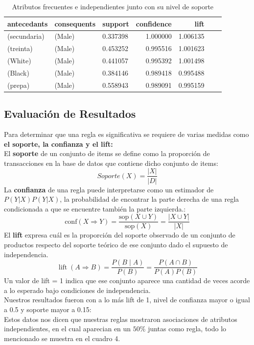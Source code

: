 \documentclass[sigconf]{acmart}
\begin{document}
\begin{table}[ht]
\begin{tabular}{lllrrrr}
\toprule
  antecedants & consequents &   support &  confidence &      lift \\
\midrule
  (secundaria) &      (Male) &  0.337398 &    1.000000 &  1.006135 \\
     (treinta) &      (Male) &  0.453252 &    0.995516 &  1.001623  \\
       (White) &      (Male) &  0.441057 &    0.995392 &  1.001498 \\
     (Black) &      (Male) &  0.384146 &    0.989418 &  0.995488  \\
      (prepa) &      (Male) &  0.558943 &    0.989091 &  0.995159 \\
\bottomrule
\end{tabular}
\begin{center}
\caption{Atributos frecuentes e independientes junto con su nivel de soporte}
\label{tab:resultado}
\end{center}
\end{table}


\subsection{Evaluación de Resultados}
Para determinar que una regla es significativa se requiere de varias medidas como \textbf{el soporte, la confianza y el lift:}\\
El \textbf{soporte} de un conjunto de items se define como la proporción de transacciones en la base de datos que contiene dicho conjunto de items:
\begin{equation} \label{eq:solve1}
Soporte(X)=\frac{|X|}{|D|}
\end{equation}
La \textbf{confianza} de una regla puede interpretarse como un estimador de ${\displaystyle P(Y|X)} {\displaystyle P(Y|X)}$, la probabilidad de encontrar la parte derecha de una regla condicionada a que se encuentre también la parte izquierda.:
\begin{equation} \label{eq:solve2}
{\displaystyle \mathrm {conf} (X\Rightarrow Y)={\frac {\mathrm {sop} (X\cup Y)}{\mathrm {sop} (X)}}={\frac {\left|X\cup Y\right\vert }{\left|X\right\vert }}}
\end{equation}
El \textbf{lift} expresa cuál es la proporción del soporte observado de un conjunto de productos respecto del soporte teórico de ese conjunto dado el supuesto de independencia. 
\begin{equation} \label{eq:solve3}
 \operatorname{lift}(A \Rightarrow B) = \frac{P(B\mid A)}{P(B)} = \frac{P(A\cap B)}{P(A)P(B)}
\end{equation}
Un valor de lift = 1 indica que ese conjunto aparece una cantidad de veces acorde a lo esperado bajo condiciones de independencia.\\
Nuestros resultados fueron con a lo más lift de 1, nivel de confianza mayor o igual a 0.5 y soporte mayor a 0.15:\\ Estos datos nos dicen que nuestras reglas mostraron asociaciones de atributos independientes, en el cual aparecian en un $50\%$ juntas como regla, todo lo mencionado se muestra en el cuadro 4.
\end{document}
